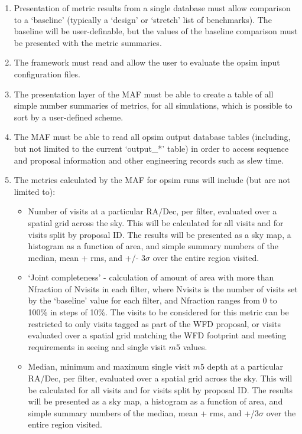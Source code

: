 \documentclass[11pt, preprint]{aastex}
\begin{document}
\begin{enumerate}
\item{Presentation of metric results from a single database must allow
  comparison to a `baseline' (typically a `design' or `stretch' list
  of benchmarks). The baseline will be user-definable, but the values of
  the baseline comparison must be presented with the metric summaries.}
\item{The framework must read and allow the user to evaluate the 
opsim input  configuration files.}
\item{The presentation layer of the MAF must be able to create a table of all
simple number summaries of metrics, for all simulations, which is possible to 
sort by a user-defined scheme. }
\item{The MAF must be able to read all opsim output database tables (including, but
not limited to the current `output\_*' table) in order to access sequence and proposal information and
other engineering records such as slew time.}
\item{The metrics calculated by the MAF for opsim runs will include (but are not limited to):
\begin{itemize}
\item{Number of visits at a particular RA/Dec, per filter, evaluated over a spatial grid across the sky. 
This will be calculated for all visits and for visits split by proposal ID. 
The results will be presented as a sky map, a histogram as a function of area, and simple summary numbers
of the median, mean + rms, and +/- 3$\sigma$ over the entire region visited.}
\item{`Joint completeness' - calculation of amount of area with more than Nfraction of Nvisits in each filter, 
where Nvisits is the number of visits set by the `baseline' value for each filter, and Nfraction ranges from 0 to 100\% 
in steps of 10\%. The visits to be considered for this metric can be restricted to only visits tagged as part of the WFD proposal,
or visits evaluated over a spatial grid matching the WFD footprint and meeting requirements in seeing and single visit $m5$ values. }
\item{Median, minimum and maximum single visit $m5$ depth at a particular RA/Dec, per filter, evaluated over a spatial
grid across the sky. This will be calculated for all visits and for visits split by proposal ID. The results
will be presented as a sky map, a histogram as a function of area, and simple summary numbers of the median, mean + rms,
and +/3$\sigma$ over the entire region visited.}

\end{itemize}}
\end{enumerate}
\end{document}
